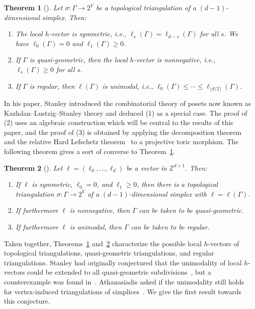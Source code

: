 \documentclass[11pt]{article}
\newtheorem{theo}{Theorem}[section]
\theoremstyle{definition}
\numberwithin{equation}{section}
\numberwithin{equation}{section}
\begin{document}
\begin{theo}[\cite{Stanleylocalh}]\label{thm:localhstructure}
Let $\sigma \colon \Gamma \to 2^V$ be a topological triangulation of a $(d-1)$-dimensional simplex. Then:
\begin{enumerate}
\item The local $h$-vector is symmetric, i.e., $\ell_s(\Gamma) = \ell_{d-s}(\Gamma)$ for all $s$. We have $\ell_0(\Gamma) = 0$ and $\ell_1(\Gamma) \ge 0$.
\item If $\Gamma$ is quasi-geometric, then the local $h$-vector is nonnegative, i.e., $\ell_s(\Gamma) \ge 0$ for all $s$. 
\item If $\Gamma$ is regular, then $\ell(\Gamma)$ is unimodal, i.e., $\ell_0(\Gamma) \le \dotsb \le \ell_{\lfloor d/2 \rfloor}(\Gamma)$. 
\end{enumerate}
\end{theo}

In his paper, Stanley introduced the combinatorial theory of posets now known as Kazhdan--Lustzig--Stanley theory and deduced (1) as a special case.
The proof of (2) uses an algebraic construction which will be central to the results of this paper, and the proof of (3) is obtained by applying the decomposition theorem and the relative Hard Lefschetz theorem~\cite{BBDG} to a projective toric morphism. 
The following theorem gives a sort of converse to Theorem~\ref{thm:localhstructure}. 

\begin{theo}[\cite{ChanLocal,JKSS}]\label{thm:construction}
Let $\ell = (\ell_0, \dotsc, \ell_d)$ be a vector in $\mathbb{Z}^{d+1}$. Then:
\begin{enumerate}
\item If $\ell$ is symmetric, $\ell_0 = 0$, and $\ell_1 \ge 0$, then there is a topological triangulation $\sigma \colon \Gamma \to 2^V$ of a $(d-1)$-dimensional simplex with $\ell = \ell(\Gamma)$. 
\item If furthermore $\ell$ is nonnegative, then $\Gamma$ can be taken to be quasi-geometric. 
\item If furthermore $\ell$ is unimodal, then $\Gamma$ can be taken to be regular. 
\end{enumerate}
\end{theo}

Taken together, Theorems~\ref{thm:localhstructure} and~\ref{thm:construction} characterize the possible local $h$-vectors of topological triangulations, quasi-geometric triangulations, and regular triangulations. 
Stanley had originally conjectured that the unimodality of local $h$-vectors could be extended to all quasi-geometric subdivisions~\cite[Conjecture 5.4]{Stanleylocalh}, but a counterexample 
was found in~\cite[Example 3.4]{AthanasiadisFlag}. Athanasiadis asked if the unimodality still holds for vertex-induced triangulations of simplices~\cite[Question 3.5]{AthanasiadisFlag}. We give the first result towards this conjecture. 
\end{document}

